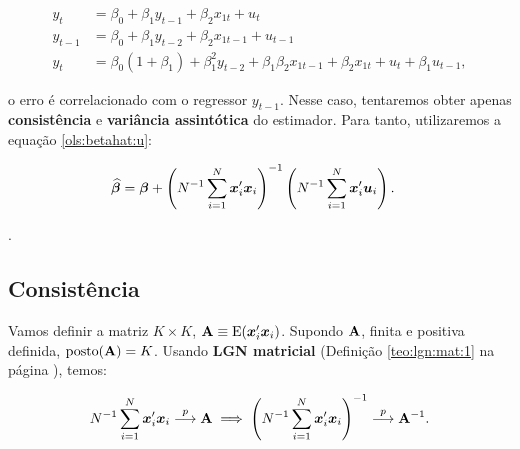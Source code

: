 \documentclass[11pt, oneside, a4paper, article]{article}
\numberwithin{equation}{section}
\begin{document}
\vspace{-1 em}
\begin{align*}
y_{t} &= \beta_{0} + \beta_{1} y_{t-1} + \beta_{2} x_{1t} + u_{t}
\\
y_{t-1} &= \beta_{0} + \beta_{1} y_{t-2} + \beta_{2} x_{1t-1} + u_{t-1}
\\
y_{t} &=
\beta_{0}(1 + \beta_{1})
+
\beta_{1}^2 y_{t-2}
+
\beta_{1} 
\beta_{2} x_{1t-1} 
+
\beta_{2} x_{1t} 
+
u_{t}
+
\beta_{1} u_{t-1},
\end{align*}

\noindent
o erro é correlacionado com o regressor $y_{t-1}$.
Nesse caso, tentaremos obter apenas \textbf{consistência} e \textbf{variância assintótica} do estimador.
Para tanto, utilizaremos a equação \eqref{ols:betahat:u}: 

\vspace{-1 em}
\begin{align*}
\widehat{\boldsymbol{\beta}} &= 
\boldsymbol{\beta} +
\left( N^{-1} \sum_{i=1}^{N} \boldsymbol{x}_{i}' \boldsymbol{x}_{i} \right)^{-1}
\left( N^{-1} \sum_{i=1}^{N} \boldsymbol{x}_{i}' \boldsymbol{u}_{i} \right).
\end{align*}

\vspace{1 em}
\begin{center}
	\Large{.}
\end{center}
\vspace{1 em}

\subsection{Consistência}
Vamos definir a matriz $K \times K$, $\mathbf{A} \equiv \text{E}(\boldsymbol{x}_{i}' \boldsymbol{x}_{i})$.
Supondo $\mathbf{A}$, finita e positiva definida, $\text{posto}(\mathbf{A}) = K$.
Usando \textbf{LGN matricial} (Definição \ref{teo:lgn:mat:1} na página \pageref{teo:lgn:mat:1}), temos: 

\noindent
{}

\vspace{-1 em}
\begin{align} \label{eq:Amat}
N^{-1} \sum_{i=1}^{N} \boldsymbol{x}_{i}' \boldsymbol{x}_{i}
 \overset{p}{\longrightarrow}  \mathbf{A}
\implies
\left( N^{-1} \sum_{i=1}^{N} \boldsymbol{x}_{i}' \boldsymbol{x}_{i} \right)^{-1}
 \overset{p}{\longrightarrow}  \mathbf{A}^{-1}.
\end{align}
\end{document}

